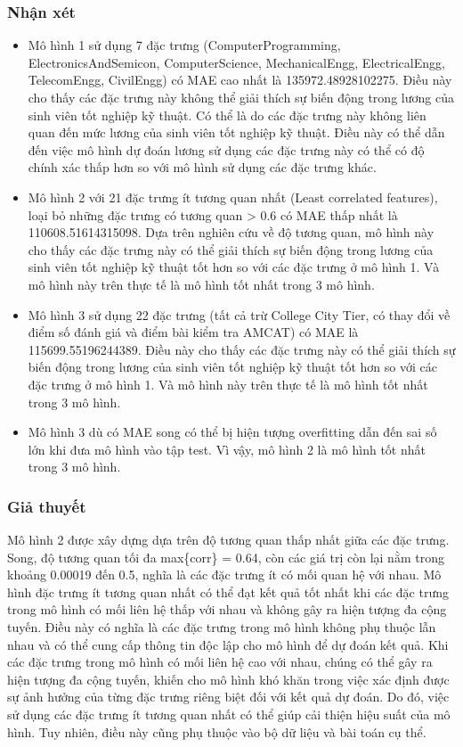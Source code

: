 \documentclass[]{article}
\begin{document}
\subsubsection{Nhận xét}
\begin{itemize}
  \item Mô hình 1 sử dụng 7 đặc trưng (ComputerProgramming, ElectronicsAndSemicon, ComputerScience, MechanicalEngg, ElectricalEngg, TelecomEngg, CivilEngg) có MAE cao nhất là 135972.48928102275. Điều này cho thấy các đặc trưng này không thể giải thích sự biến động trong lương của sinh viên tốt nghiệp kỹ thuật. Có thể là do các đặc trưng này không liên quan đến mức lương của sinh viên tốt nghiệp kỹ thuật. Điều này có thể dẫn đến việc mô hình dự đoán lương sử dụng các đặc trưng này có thể có độ chính xác thấp hơn so với mô hình sử dụng các đặc trưng khác.
  \item Mô hình 2 với 21 đặc trưng ít tương quan nhất (Least correlated features), loại bỏ những đặc trưng có tương quan > 0.6 có MAE thấp nhất là 110608.51614315098. Dựa trên nghiên cứu về độ tương quan, mô hình này cho thấy các đặc trưng này có thể giải thích sự biến động trong lương của sinh viên tốt nghiệp kỹ thuật tốt hơn so với các đặc trưng ở mô hình 1. Và mô hình này trên thực tế là mô hình tốt nhất trong 3 mô hình.
  \item Mô hình 3 sử dụng 22 đặc trưng (tất cả trừ College City Tier, có thay đổi về điểm số đánh giá và điểm bài kiểm tra AMCAT) có MAE là 115699.55196244389. Điều này cho thấy các đặc trưng này có thể giải thích sự biến động trong lương của sinh viên tốt nghiệp kỹ thuật tốt hơn so với các đặc trưng ở mô hình 1. Và mô hình này trên thực tế là mô hình tốt nhất trong 3 mô hình.
  \item Mô hình 3 dù có MAE song có thể bị hiện tượng overfitting dẫn đến sai số lớn khi đưa mô hình vào tập test. Vì vậy, mô hình 2 là mô hình tốt nhất trong 3 mô hình.
\end{itemize}
\subsubsection{Giả thuyết}
Mô hình 2 được xây dựng dựa trên độ tương quan thấp nhất giữa các đặc trưng. Song, độ tương quan tối đa max\{corr\} = 0.64, còn các giá trị còn lại nằm trong khoảng 0.00019 đến 0.5, nghĩa là các đặc trưng ít có mối quan hệ với nhau. Mô hình đặc trưng ít tương quan nhất có thể đạt kết quả tốt nhất khi các đặc trưng trong mô hình có mối liên hệ thấp với nhau và không gây ra hiện tượng đa cộng tuyến. Điều này có nghĩa là các đặc trưng trong mô hình không phụ thuộc lẫn nhau và có thể cung cấp thông tin độc lập cho mô hình để dự đoán kết quả. Khi các đặc trưng trong mô hình có mối liên hệ cao với nhau, chúng có thể gây ra hiện tượng đa cộng tuyến, khiến cho mô hình khó khăn trong việc xác định được sự ảnh hưởng của từng đặc trưng riêng biệt đối với kết quả dự đoán. Do đó, việc sử dụng các đặc trưng ít tương quan nhất có thể giúp cải thiện hiệu suất của mô hình. Tuy nhiên, điều này cũng phụ thuộc vào bộ dữ liệu và bài toán cụ thể. 
\end{document}
